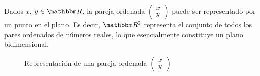 Dados $x$, $y \in \RR$, la pareja ordenada $\begin{pmatrix} x \\ y \end{pmatrix}$ puede ser representado por un punto en el plano. Es decir, $\RR[2]$ representa el conjunto de todos los pares ordenados de números reales, lo que esencialmente constituye un plano bidimensional.
\begin{figure}[h!]
    \centering 
    \caption{Representación de una pareja ordenada $\begin{pmatrix} x \\ y \end{pmatrix}$}
\end{figure}

